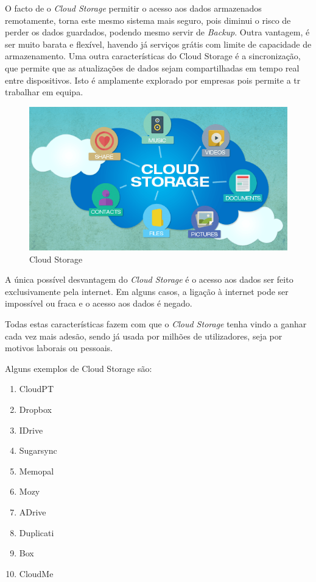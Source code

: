 \documentclass{report}
\begin{document}
O facto de o \textit{Cloud Storage} permitir o acesso aos dados armazenados remotamente, torna este mesmo sistema mais seguro, pois diminui o risco de perder os dados guardados, podendo mesmo servir de \textit{Backup}. 
Outra vantagem, é ser muito barata e flexível, havendo já serviços grátis com limite de capacidade de armazenamento. 
Uma outra características do Cloud Storage  é a sincronização, que permite que as atualizações de dados sejam compartilhadas em tempo real entre dispositivos. Isto é amplamente explorado por empresas pois permite a tr trabalhar em equipa.
\vspace{1mm}

	\begin{figure} [b]
		\centering
		\includegraphics[scale=0.4]{cloud-storage.png}
		\caption{Cloud Storage}
	\end{figure}

A única possível desvantagem do \textit{Cloud Storage} é o acesso aos dados ser feito exclusivamente pela internet. Em alguns casos, a ligação à internet pode ser impossível ou fraca e o acesso aos dados é negado.

\newpage

Todas estas características fazem com que o \textit{Cloud Storage} tenha vindo a ganhar cada vez mais adesão, sendo já usada por milhões de utilizadores, seja por motivos laborais ou pessoais.
\vspace{1mm}

	Alguns exemplos de Cloud Storage são:
	\begin{enumerate}
		\item CloudPT
		\item  Dropbox
		\item  IDrive
		\item Sugarsync
		\item Memopal
		\item Mozy
		\item ADrive
		\item Duplicati
		\item Box
		\item CloudMe
	\end{enumerate} 
	
\end{document}
